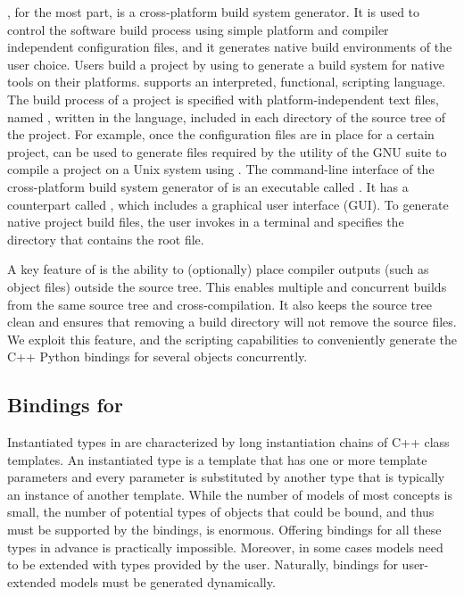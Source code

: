 \cmake{}, for the most part, is a cross-platform build system
generator.  It is used to control the software build process using
simple platform and compiler independent configuration files, and it
generates native build environments of the user choice. Users build a
project by using \cmake{} to generate a build system for native tools
on their platforms. \cmake{} supports an interpreted, functional,
scripting language. The build process of a project is specified with
platform-independent \cmake{} text files, named
, written in the \cmake{} language,
included in each directory of the source tree of the project. For
example, once the \cmake{} configuration files are in place for a
certain project, \cmake{} can be used to generate
 files required by the 
utility of the GNU suite to compile a project on a Unix system using
. The command-line interface of the cross-platform
build system generator of \cmake{} is an executable called
. It has a counterpart called
, which includes a graphical user interface
(GUI). To generate native project build files, the user invokes
 in a terminal and specifies the directory that
contains the root  file.

A key feature of \cmake{} is the ability to (optionally) place
compiler outputs (such as object files) outside the source tree. This
enables multiple and concurrent builds from the same source tree and
cross-compilation. It also keeps the source tree clean and ensures
that removing a build directory will not remove the source files.  We
exploit this feature, and the scripting capabilities to conveniently
generate the C++ Python bindings for several \cgal{} objects
concurrently.

\subsection{Bindings for \cgal}
\label{ssec:intro:cgal}
Instantiated types in \cgal{} are characterized by long instantiation
chains of C++ class templates. An instantiated type is a template that
has one or more template parameters and every parameter is substituted
by another type that is typically an instance of another
template. While the number of models of most concepts is small, the
number of potential types of objects that could be bound, and thus
must be supported by the bindings, is enormous. Offering bindings for
all these types in advance is practically impossible. Moreover, in
some cases models need to be extended with types provided by the
user. Naturally, bindings for user-extended models must be generated
dynamically.


